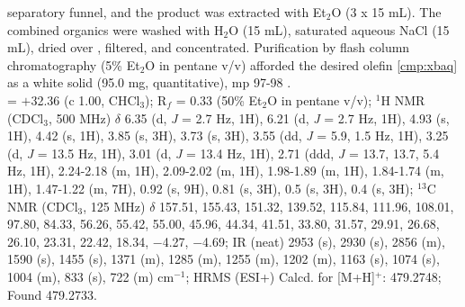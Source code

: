 separatory funnel, and the product was extracted with Et$_2$O (3 x 15 mL). The combined organics
were washed with H$_2$O (15 mL), saturated aqueous NaCl (15 mL), dried over , filtered,
and concentrated. Purification by flash column chromatography (5\% Et$_2$O in pentane v/v) afforded
the desired olefin \ref{cmp:xbaq} as a white solid (95.0 mg, quantitative), mp 97-98 \degc.\\
\rotation = $+$32.36 (c 1.00, CHCl$_3$); R$_f$ = 0.33 (50\% Et$_2$O in pentane v/v); $^1$H NMR (CDCl$_3$, 500
MHz) $\delta$ 6.35 (d, \textit{J} = 2.7 Hz, 1H), 6.21 (d, \textit{J} = 2.7 Hz, 1H), 4.93 (s, 1H), 4.42 (s, 1H), 3.85 (s, 3H),
3.73 (s, 3H), 3.55 (dd, \textit{J} = 5.9, 1.5 Hz, 1H), 3.25 (d, \textit{J} = 13.5 Hz, 1H), 3.01 (d, \textit{J} = 13.4 Hz, 1H),
2.71 (ddd, \textit{J} = 13.7, 13.7, 5.4 Hz, 1H), 2.24-2.18 (m, 1H), 2.09-2.02 (m, 1H), 1.98-1.89 (m, 1H),
1.84-1.74 (m, 1H), 1.47-1.22 (m, 7H), 0.92 (s, 9H), 0.81 (s, 3H), 0.5 (s, 3H), 0.4 (s, 3H); $^{13}$C
NMR (CDCl$_3$, 125 MHz) $\delta$ 157.51, 155.43, 151.32, 139.52, 115.84, 111.96, 108.01, 97.80, 84.33, 56.26, 55.42, 55.00, 45.96, 44.34, 41.51, 33.80, 31.57, 29.91, 26.68, 26.10, 23.31, 22.42, 18.34, $-$4.27, $-$4.69; IR (neat) 2953 (s), 2930 (s), 2856 (m), 1590 (s), 1455 (s), 1371 (m), 1285 (m), 1255
(m), 1202 (m), 1163 (s), 1074 (s), 1004 (m), 833 (s), 722 (m) cm$^{-1}$; HRMS (ESI+) Calcd. for
 [M+H]$^+$: 479.2748; Found 479.2733.

